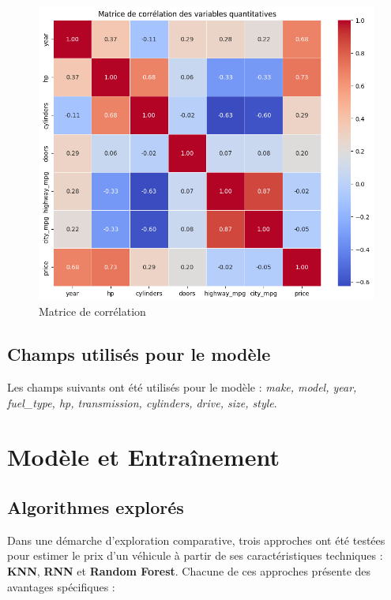 \documentclass[12pt]{report}
\begin{document}
\begin{figure}[H]
    \centering
    \includegraphics[width=1\textwidth]{correlation_matrix.png}
    \caption{Matrice de corrélation}
    \label{fig:correlation-matrix}
\end{figure}
\subsection{Champs utilisés pour le modèle}
Les champs suivants ont été utilisés pour le modèle : \textit{make, model, year, fuel\_type, hp, transmission, cylinders, drive, size, style}.


\section{Modèle et Entraînement}

\subsection{Algorithmes explorés}

Dans une démarche d'exploration comparative, trois approches ont été testées pour estimer le prix d’un véhicule à partir de ses caractéristiques techniques : \textbf{KNN}, \textbf{RNN} et \textbf{Random Forest}. Chacune de ces approches présente des avantages spécifiques :
\end{document}

